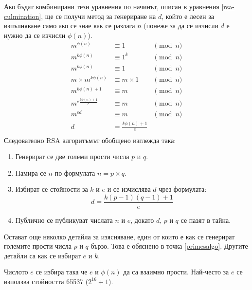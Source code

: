  Ако бъдат комбинирани тези уравнения по начинът, описан в уравнения \ref{rsa-culmination}, ще се получи метод за генериране на $d$, който е лесен за изпълняване само ако се знае как се разлага $n$ (понеже за да се изчисли $d$ е нужно да се изчисли $\phi(n)$).
  \begin{equation}
    \begin{alignedat}{2}
      m^{\phi(n)} &\equiv 1 &\pmod n \\
      m^{k\phi(n)} &\equiv 1^k &\pmod n \\
      m^{k\phi(n)} &\equiv 1 &\pmod n \\
      m\times m^{k\phi(n)} &\equiv m\times 1 &\pmod n \\
      m^{k\phi(n)+1} &\equiv m &\pmod n \\
      m^{e\frac{k\phi(n)+1}{e}} &\equiv m &\pmod n \\
      m^{ed} &\equiv m &\pmod n\\
      d &= \frac{k\phi(n)+1}{e} \\
    \end{alignedat}
    \label{rsa-culmination}
  \end{equation}
  Следователно RSA алгоритъмът обобщено изглежда така:
  \begin{enumerate}
    \item Генерират се две големи прости числа $p$ и $q$.
    \item Намира се $n$ по формулата $n = p \times q$.
    \item Избират се стойности за $k$ и $e$ и се изчислява $d$ чрез формулата: $$d = \frac{k(p-1)(q-1)+1}{e}$$
    \item Публично се публикуват числата $n$ и $e$, докато $d$, $p$ и $q$ се пазят в тайна.
  \end{enumerate}

  Остават още няколко детайла за изясняване, един от които е как се генерират големите прости числа $p$ и $q$ бързо. Това е обяснено в точка \ref{primesalgo}. Другите детайли са как се избират $e$ и $k$.

  Числото $e$ се избира така че $e$ и $\phi(n)$ да са взаимно прости. %
  Най-често за $e$ се използва стойността 65537 ($2^{16}+1$). %

